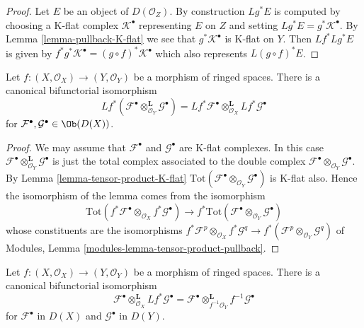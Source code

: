 \begin{proof}
Let $E$ be an object of $D(\mathcal{O}_Z)$.
By construction $Lg^*E$ is computed by choosing a K-flat complex
$\mathcal{K}^\bullet$ representing $E$ on $Z$ and
setting $Lg^*E = g^*\mathcal{K}^\bullet$.
By Lemma \ref{lemma-pullback-K-flat} we see that $g^*\mathcal{K}^\bullet$
is K-flat on $Y$. Then $Lf^*Lg^*E$ is given by
$f^*g^*\mathcal{K}^\bullet = (g \circ f)^*\mathcal{K}^\bullet$
which also represents $L(g \circ f)^*E$.
\end{proof}

\begin{lemma}
\label{lemma-pullback-tensor-product}
Let $f : (X, \mathcal{O}_X) \to (Y, \mathcal{O}_Y)$
be a morphism of ringed spaces. There is a canonical bifunctorial
isomorphism
$$
Lf^*(
\mathcal{F}^\bullet \otimes_{\mathcal{O}_Y}^{\mathbf{L}} \mathcal{G}^\bullet
) =
Lf^*\mathcal{F}^\bullet 
\otimes_{\mathcal{O}_X}^{\mathbf{L}}
Lf^*\mathcal{G}^\bullet 
$$
for $\mathcal{F}^\bullet, \mathcal{G}^\bullet \in \Ob(D(X))$.
\end{lemma}

\begin{proof}
We may assume that $\mathcal{F}^\bullet$ and $\mathcal{G}^\bullet$
are K-flat complexes. In this case
$\mathcal{F}^\bullet \otimes_{\mathcal{O}_Y}^{\mathbf{L}} \mathcal{G}^\bullet$
is just the total complex associated to the double complex
$\mathcal{F}^\bullet \otimes_{\mathcal{O}_Y} \mathcal{G}^\bullet$.
By
Lemma \ref{lemma-tensor-product-K-flat}
$\text{Tot}(\mathcal{F}^\bullet \otimes_{\mathcal{O}_Y} \mathcal{G}^\bullet)$
is K-flat also. Hence the isomorphism of the lemma comes from the
isomorphism
$$
\text{Tot}(f^*\mathcal{F}^\bullet \otimes_{\mathcal{O}_X}
f^*\mathcal{G}^\bullet)
\longrightarrow
f^*\text{Tot}(\mathcal{F}^\bullet \otimes_{\mathcal{O}_Y} \mathcal{G}^\bullet)
$$
whose constituents are the isomorphisms
$f^*\mathcal{F}^p \otimes_{\mathcal{O}_X} f^*\mathcal{G}^q \to
f^*(\mathcal{F}^p \otimes_{\mathcal{O}_Y} \mathcal{G}^q)$ of
Modules, Lemma \ref{modules-lemma-tensor-product-pullback}.
\end{proof}

\begin{lemma}
\label{lemma-variant-derived-pullback}
Let $f : (X, \mathcal{O}_X) \to (Y, \mathcal{O}_Y)$
be a morphism of ringed spaces. There is a canonical bifunctorial
isomorphism
$$
\mathcal{F}^\bullet
\otimes_{\mathcal{O}_X}^{\mathbf{L}}
Lf^*\mathcal{G}^\bullet
=
\mathcal{F}^\bullet 
\otimes_{f^{-1}\mathcal{O}_Y}^{\mathbf{L}}
f^{-1}\mathcal{G}^\bullet 
$$
for $\mathcal{F}^\bullet$ in $D(X)$ and $\mathcal{G}^\bullet$ in $D(Y)$.
\end{lemma}

